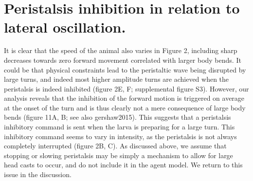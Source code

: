 \documentclass[10pt,a4paper]{article}
\begin{document}
\section{Peristalsis inhibition in relation to lateral oscillation.}
It is clear that the speed of the animal also varies in Figure 2, including sharp decreases towards zero forward movement correlated with larger body bends. It could be that physical constraints lead to the peristaltic wave being disrupted by large turns, and indeed most higher amplitude turns are achieved when the peristalsis is indeed inhibited (figure 2E, F; supplemental figure S3). However, our analysis reveals that the inhibition of the forward motion is triggered on average at the onset of the turn and is thus clearly not a mere consequence of large body bends (figure 11A, B; see also gershaw2015). This suggests that a peristalsis inhibitory command is sent when the larva is preparing for a large turn. This inhibitory command seems to vary in intensity, as the peristalsis is not always completely interrupted (figure 2B, C). As discussed above, we assume that stopping or slowing peristalsis may be simply a mechanism to allow for large head casts to occur, and do not include it in the agent model. We return to this issue in the discussion.
\end{document}
